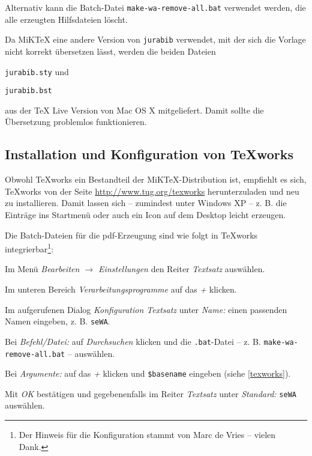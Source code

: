 Alternativ kann die Batch-Datei \verb+make-wa-remove-all.bat+ verwendet werden, die alle erzeugten 
Hilfsdateien l\"oscht.




Da MiKTeX eine andere Version von \verb+jurabib+ verwendet, mit der sich die 
Vorlage nicht korrekt \"ubersetzen l\"asst, werden die beiden Dateien 

\begin{seList}
\item \verb+jurabib.sty+ und 
\item \verb+jurabib.bst+
\end{seList}

aus der TeX Live Version von Mac OS X mitgeliefert. Damit sollte die 
\"Ubersetzung problemlos funktionieren. 

\subsection{Installation und Konfiguration von TeXworks}

Obwohl TeXworks ein Bestandteil der MiKTeX-Distribution ist, empfiehlt es sich, 
TeXworks von der Seite \url{http://www.tug.org/texworks} herunterzuladen und 
neu zu installieren. Damit lassen sich -- zumindest unter Windows XP -- z. B. die Eintr\"age 
ins Startmen\"u oder auch ein Icon auf dem Desktop leicht erzeugen.   

Die Batch-Dateien f\"ur die pdf-Erzeugung sind wie folgt in TeXworks integrierbar\footnote{Der Hinweis f\"ur die 
Konfiguration stammt von Marc de Vries -- vielen Dank.}:

\begin{seList}
\item
Im Men\"u \textsl{Bearbeiten $\rightarrow$ Einstellungen} den Reiter \textsl{Textsatz} ausw\"ahlen.
\item 
Im unteren Bereich \textsl{Verarbeitungsprogramme} auf das \textsl{+} klicken.
\item
Im aufgerufenen Dialog \textsl{Konfiguration Textsatz} unter \textsl{Name:} einen passenden 
Namen eingeben, z. B. \texttt{seWA}.
\item
Bei \textsl{Befehl/Datei:} auf \textsl{Durchsuchen} klicken und die \texttt{.bat}-Datei \newline 
\hspace*{\fill} -- z. B. \texttt{make-wa-remove-all.bat} -- \hspace*{\fill}\newline 
         ausw\"ahlen. 
\item
Bei \textsl{Argumente:} auf das \textsl{+} klicken und \texttt{\$basename} eingeben (siehe \vref{texworks}).
\item
Mit \textsl{OK} best\"atigen und gegebenenfalls im Reiter \textsl{Textsatz} unter \textsl{Standard:} 
\texttt{seWA} ausw\"ahlen.         
\end{seList}

